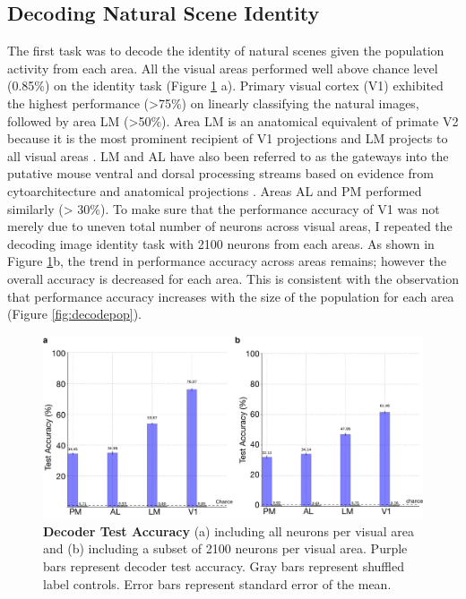 \subsection{Decoding Natural Scene Identity}
The first task was to decode the identity of natural scenes given the population activity from each area. All the visual areas performed well above chance level (0.85\%) on the identity task (Figure \ref{fig:decodebar} a). Primary visual cortex (V1) exhibited the highest performance (>75\%) on linearly classifying the natural images, followed by area LM (>50\%). Area LM is an anatomical equivalent of primate V2 because it is the most prominent recipient of V1 projections and LM projects to all visual areas \parencite{Wang2012}. LM and AL have also been referred to as the gateways into the putative mouse ventral and dorsal processing streams based on evidence from cytoarchitecture and anatomical projections \parencite{wang2011,Wang2013a}.  Areas AL and PM performed similarly (> 30\%). To make sure that the performance accuracy of V1 was not merely due to uneven total number of neurons across visual areas, I repeated the decoding image identity task with 2100 neurons from each areas. As shown in Figure \ref{fig:decodebar}b, the trend in performance accuracy across areas remains; however the overall accuracy is decreased for each area. This is consistent with the observation that performance accuracy increases with the size of the population for each area (Figure \ref{fig:decodepop}).\par 
\begin{figure}
  \centering
    \includegraphics[width=\textwidth]{Figures/chapter5/accuracy_all_and_2100_neurons.png}
    \caption[Decoder Test Accuracy]{\textbf{Decoder Test Accuracy} (a) including all neurons per visual area and (b) including a subset of 2100 neurons per visual area. Purple bars represent decoder test accuracy. Gray bars represent shuffled label controls. Error bars represent standard error of the mean.}
  \label{fig:decodebar}
\end{figure}
